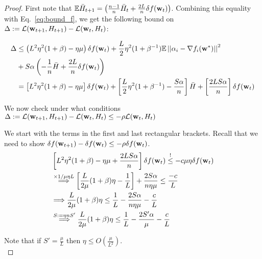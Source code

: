 \documentclass[12pt]{article}
\newcommand{\sqnorm}[1]{\left|\left|#1\right|\right|^2}
\newcommand{\w}{{\bf w}}
\newcommand{\wstar}{{\bf w^*}}
\newcommand{\E}{\mathbb{E}}
\renewcommand{\L}{{\mathcal L}}
\newcommand{\Hbar}{\bar{H}}
\begin{document}
\begin{proof}

First note that $\E \Hbar_{t+1} = \left(\frac{n-1}{n} \Hbar_t + \frac{2L}{n} \delta f(\w_t) \right)$. Combining this equality with Eq.~\ref{eq:bound_f}, we get the following bound on $\Delta := \L(\w_{t+1}, H_{t+1}) - \L(\w_t, H_t)$:

\begin{align}
\Delta &\leq
\left( L^2 \eta^2 (1+\beta) - \eta \mu \right) \delta f(\w_{t}) + \frac{L}{2} \eta^2 (1+\beta^{-1}) \E \sqnorm{\alpha_i - \nabla f_i(\wstar)} \nonumber \\
&+ S\alpha \left( - \frac{1}{n} \Hbar + \frac{2L}{n} \delta f(\w_t) \right) \nonumber \\
&= \left[ L^2 \eta^2 (1+\beta) - \eta \mu \right] \delta f(\w_{t}) + \left[ \frac{L}{2} \eta^2 (1+\beta^{-1}) - \frac{S\alpha}{n} \right] \Hbar + \left[ \frac{2LS \alpha}{n} \right] \delta f(\w_t)
\end{align}

We now check under what conditions $\Delta := \L(\w_{t+1}, H_{t+1}) - \L(\w_t, H_t) \leq -\rho \L(\w_t, H_t)$

We start with the terms in the first and last rectangular brackets. Recall that we need to show $\delta f(\w_{t+1}) - \delta f(\w_t) \leq -\rho \delta f(\w_t)$.
\begin{align}
& \left[ L^2 \eta^2 (1+\beta) - \eta \mu  + \frac{2LS\alpha}{n} \right] \delta f(\w_t) \stackrel{!}\leq -c\mu \eta \delta f(\w_t) \nonumber \\
& \stackrel{\times 1/\mu \eta L}\Longrightarrow \left[ \frac{L}{2\mu} (1+\beta) \eta - \frac1L \right] + \frac{2S\alpha}{n\eta\mu} \leq \frac{-c}{L} \nonumber \\
& \Longrightarrow \frac{L}{2\mu} (1+\beta) \eta \leq \frac1L - \frac{2S\alpha}{n\eta\mu} - \frac{c}{L} \nonumber \\
& \stackrel{S:=\eta n S'}\Longrightarrow \frac{L}{2\mu} (1+\beta) \eta \leq \frac1L - \frac{2S'\alpha}{\mu} - \frac{c}{L}
\end{align}

Note that if $S'=\frac{\mu}{L}$ then $\eta \leq O(\frac{\mu}{L^2})$.\\



\end{proof}
\end{document}
